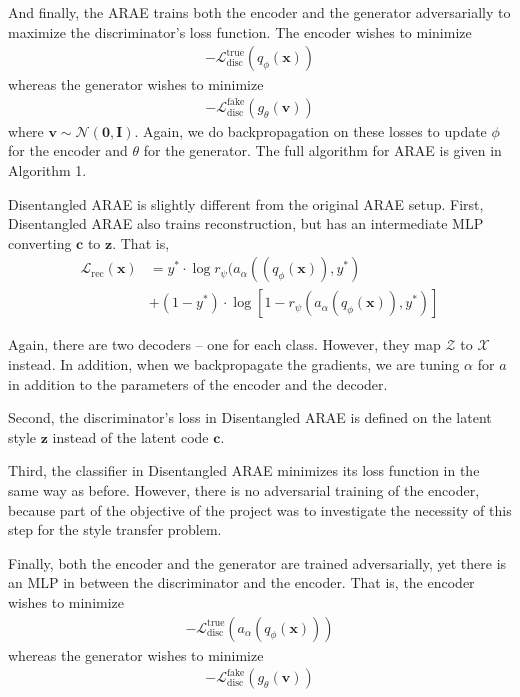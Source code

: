 \documentclass{article}
\newcommand{\vect}[1]{\boldsymbol{#1}}
\begin{document}
And finally, the ARAE trains both the encoder and the generator adversarially to maximize the discriminator's loss function.  The encoder wishes to minimize 
\begin{align*}
-\mathcal{L}_\text{disc}^\text{true}(q_\phi(\vect{x}))
\end{align*}
whereas the generator wishes to minimize
\begin{align*}
-\mathcal{L}_\text{disc}^\text{fake}(g_\theta(\vect{v}))
\end{align*}
where $\vect{v} \sim \mathcal{N}(\vect{0}, \vect{I})$.  Again, we do backpropagation on these losses to update $\phi$ for the encoder and $\theta$ for the generator.  The full algorithm for ARAE is given in Algorithm 1.

Disentangled ARAE is slightly different from the original ARAE setup.  First, Disentangled ARAE also trains reconstruction, but has an intermediate MLP converting $\vect{c}$ to $\vect{z}$.  That is,
\begin{align*}
\mathcal{L}_\text{rec}(\vect{x}) &=  y^* \cdot \log r_\psi(a_\alpha((q_\phi(\vect{x})), y^*)  \\
&+ (1 - y^*) \cdot  \log \left[1 - r_\psi(a_\alpha(q_\phi(\vect{x})), y^*) \right]
\end{align*} 

Again, there are two decoders -- one for each class.  However, they map $\mathcal{Z}$ to $\mathcal{X}$ instead.  In addition, when we backpropagate the gradients, we are tuning $\alpha$ for $a$ in addition to the parameters of the encoder and the decoder.  

Second, the discriminator's loss in Disentangled ARAE is defined on the latent style $\vect{z}$ instead of the latent code $\vect{c}$.

Third, the classifier in Disentangled ARAE minimizes its loss function in the same way as before. However, there is no adversarial training of the encoder, because part of the objective of the project was to investigate the necessity of this step for the style transfer problem.  

Finally, both the encoder and the generator are trained adversarially, yet there is an MLP in between the discriminator and the encoder.  That is, the encoder wishes to minimize
\begin{align*}
-\mathcal{L}_\text{disc}^\text{true}(a_\alpha(q_\phi(\vect{x})))
\end{align*}
whereas the generator wishes to minimize
\begin{align*}
-\mathcal{L}_\text{disc}^\text{fake}(g_\theta(\vect{v}))
\end{align*}   
\end{document}
